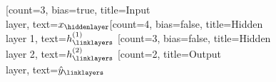 \documentclass{standalone}
\begin{document}
    \begin{neuralnetwork}[height=4, layerspacing=15mm]
        \newcommand{\x}[2]{$x_#2$}
        \newcommand{\y}[2]{$\hat{y}_#2$}
        \newcommand{\hfirst}[2]{\small $h^{(1)}_#2$}
        \newcommand{\hsecond}[2]{\small $h^{(2)}_#2$}
        [count=3, bias=true, title=\small{Input\\layer}, text=\x]
        \hiddenlayer[count=4, bias=false, title=\small{Hidden\\layer 1}, text=\hfirst] \linklayers
        \hiddenlayer[count=3, bias=false, title=\small{Hidden\\layer 2}, text=\hsecond] \linklayers
        \outputlayer[count=2, title=\small{Output\\layer}, text=\y] \linklayers
    \end{neuralnetwork}
\end{document}
